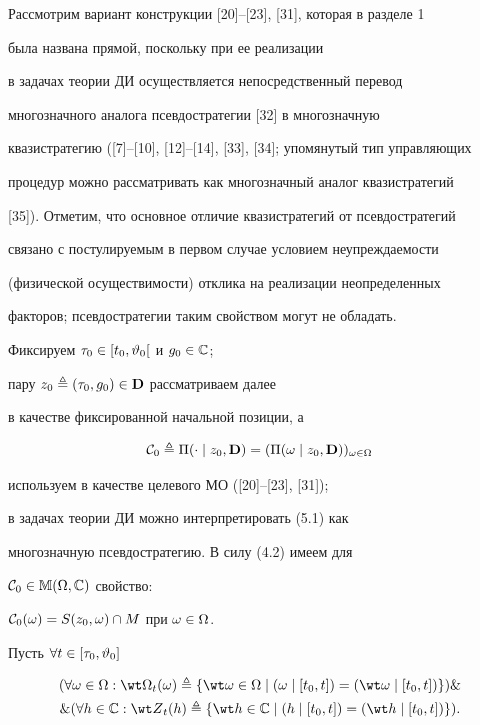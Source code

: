 Рассмотрим вариант конструкции [20]--[23], [31], которая в разделе 1


была названа прямой, поскольку при ее реализации


в задачах теории ДИ осуществляется непосредственный перевод


многозначного аналога псевдостратегии [32] в многозначную


квазистратегию ([7]--[10], [12]--[14], [33], [34]; упомянутый тип управляющих


процедур можно рассматривать как многозначный аналог квазистратегий


[35]). Отметим, что основное отличие квазистратегий от псевдостратегий


связано с постулируемым в первом случае условием неупреждаемости


(физической осуществимости) отклика на реализации неопределенных


факторов; псевдостратегии таким свойством могут не обладать.





Фиксируем ${{\tau}_0} \in [{t_0},{{\vartheta}_0}[$ и ${g_0} \in {\Bbb C}$;


пару ${z_0} \triangleq ({{\tau}_0},{g_0}) \in {\bold D}$ рассматриваем далее


в качестве фиксированной начальной позиции, а


\begin{equation}


{{\cal C}_0} \stac {\Pi}(\cdot \mid {z_0},{\bold D}) =


({\Pi}(\omega \mid {z_0},{\bold D}))_{\omega \in \Om}


\end{equation}


используем в качестве целевого МО ([20]--[23], [31]);


в задачах теории ДИ можно интерпретировать (5.1) как


многозначную псевдостратегию. В силу (4.2) имеем для


${{\cal C}_0} \in {\Bbb M}(\Omega,{\Bbb C})$ свойство:


${{\cal C}_0}(\omega) = S({z_0},\omega) \cap M$ при $\omega \in \Omega$.


Пусть $\forall{t} \in [{{\tau}_0},{{\vartheta}_0}]$


\begin{multline}


(\fo{\omega} \in \Om:{{\wt \Om}_t}(\omega) \stac \{{\wt \omega} \in


\Om \mid (\omega \mid [{t_0},t]) = ({\wt \omega} \mid [{t_0},t])\})\&\\


%


\& (\fo{h} \in {\Bbb C}:{{\wt Z}_t}(h)


\stac \{{\wt h} \in {\Bbb C}


\mid (h \mid [{t_0},t]) = ({\wt h} \mid [{t_0},t])\}).


\end{multline}


